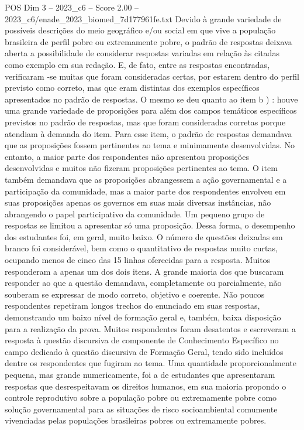 \begin{textsample}{POS Dim 3 – 2023\_c6 – Score 2.00 – 2023\_c6/enade\_2023\_biomed\_7d177961fe.txt}
Devido à grande variedade de possíveis descrições do meio geográfico e/ou social em que vive a população brasileira de perfil pobre ou extremamente pobre, o padrão de respostas deixava aberta a possibilidade de considerar respostas variadas em relação às citadas como exemplo em sua redação.
E, de fato, entre as respostas encontradas, verificaram -se muitas que foram consideradas certas, por estarem dentro do perfil previsto como correto, mas que eram distintas dos exemplos específicos apresentados no padrão de respostas.
O mesmo se deu quanto ao item b ) : houve uma grande variedade de proposições para além dos campos temáticos específicos previstos no padrão de respostas, mas que foram consideradas corretas porque atendiam à demanda do item.
Para esse item, o padrão de respostas demandava que as proposições fossem pertinentes ao tema e minimamente desenvolvidas.
No entanto, a maior parte dos respondentes não apresentou proposições desenvolvidas e muitos não fizeram proposições pertinentes ao tema.
O item também demandava que as proposições abrangessem a ação governamental e a participação da comunidade, mas a maior parte dos respondentes envolveu em suas proposições apenas os governos em suas mais diversas instâncias, não abrangendo o papel participativo da comunidade.
Um pequeno grupo de respostas se limitou a apresentar só uma proposição.
Dessa forma, o desempenho dos estudantes foi, em geral, muito baixo.
O número de questões deixadas em branco foi considerável, bem como o quantitativo de respostas muito curtas, ocupando menos de cinco das 15 linhas oferecidas para a resposta.
Muitos responderam a apenas um dos dois itens.
A grande maioria dos que buscaram responder ao que a questão demandava, completamente ou parcialmente, não souberam se expressar de modo correto, objetivo e coerente.
Não poucos respondentes repetiram longos trechos do enunciado em suas respostas, demonstrando um baixo nível de formação geral e, também, baixa disposição para a realização da prova.
Muitos respondentes foram desatentos e escreveram a resposta à questão discursiva de componente de Conhecimento Específico no campo dedicado à questão discursiva de Formação Geral, tendo sido incluídos dentre os respondentes que fugiram ao tema.
Uma quantidade proporcionalmente pequena, mas grande numericamente, foi a de estudantes que apresentaram respostas que desrespeitavam os direitos humanos, em sua maioria propondo o controle reprodutivo sobre a população pobre ou extremamente pobre como solução governamental para as situações de risco socioambiental comumente vivenciadas pelas populações brasileiras pobres ou extremamente pobres.

\end{textsample}
